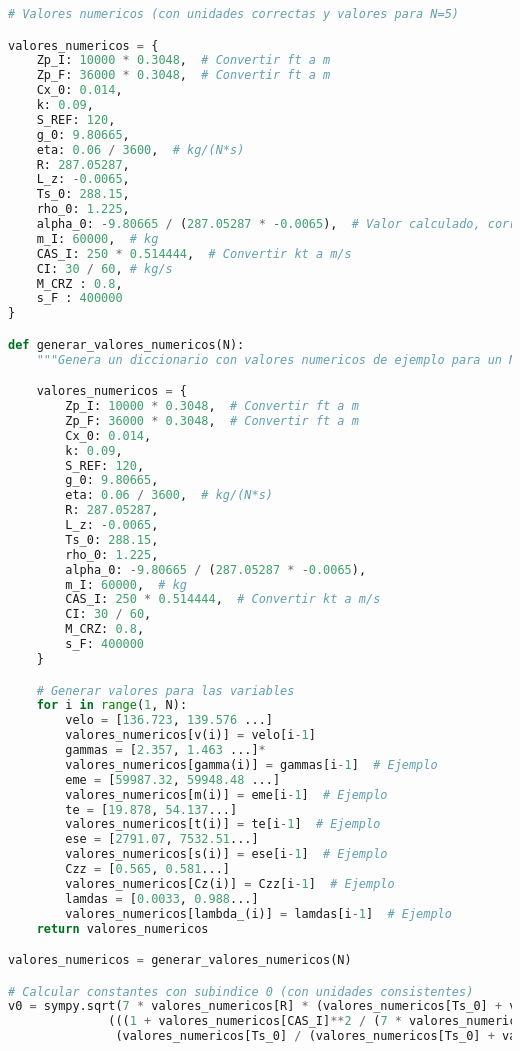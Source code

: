 \documentclass[fleqn]{article}
\begin{document}
\begin{lstlisting}[language=Python, firstnumber=last, style = mystyle]
# Valores numericos (con unidades correctas y valores para N=5)

valores_numericos = {
    Zp_I: 10000 * 0.3048,  # Convertir ft a m
    Zp_F: 36000 * 0.3048,  # Convertir ft a m
    Cx_0: 0.014,
    k: 0.09,
    S_REF: 120,
    g_0: 9.80665,
    eta: 0.06 / 3600,  # kg/(N*s)
    R: 287.05287,
    L_z: -0.0065,
    Ts_0: 288.15,
    rho_0: 1.225,
    alpha_0: -9.80665 / (287.05287 * -0.0065),  # Valor calculado, corregir signo
    m_I: 60000,  # kg
    CAS_I: 250 * 0.514444,  # Convertir kt a m/s
    CI: 30 / 60, # kg/s
    M_CRZ : 0.8,
    s_F : 400000
}

def generar_valores_numericos(N):
    """Genera un diccionario con valores numericos de ejemplo para un N dado."""

    valores_numericos = {
        Zp_I: 10000 * 0.3048,  # Convertir ft a m
        Zp_F: 36000 * 0.3048,  # Convertir ft a m
        Cx_0: 0.014,
        k: 0.09,
        S_REF: 120,
        g_0: 9.80665,
        eta: 0.06 / 3600,  # kg/(N*s)
        R: 287.05287,
        L_z: -0.0065,
        Ts_0: 288.15,
        rho_0: 1.225,
        alpha_0: -9.80665 / (287.05287 * -0.0065),
        m_I: 60000,  # kg
        CAS_I: 250 * 0.514444,  # Convertir kt a m/s
        CI: 30 / 60,
        M_CRZ: 0.8,
        s_F: 400000
    }

    # Generar valores para las variables
    for i in range(1, N):
        velo = [136.723, 139.576 ...]
        valores_numericos[v(i)] = velo[i-1]
        gammas = [2.357, 1.463 ...]*
        valores_numericos[gamma(i)] = gammas[i-1]  # Ejemplo
        eme = [59987.32, 59948.48 ...]
        valores_numericos[m(i)] = eme[i-1]  # Ejemplo
        te = [19.878, 54.137...]
        valores_numericos[t(i)] = te[i-1]  # Ejemplo
        ese = [2791.07, 7532.51...]
        valores_numericos[s(i)] = ese[i-1]  # Ejemplo
        Czz = [0.565, 0.581...]
        valores_numericos[Cz(i)] = Czz[i-1]  # Ejemplo
        lamdas = [0.0033, 0.988...]
        valores_numericos[lambda_(i)] = lamdas[i-1]  # Ejemplo
    return valores_numericos

valores_numericos = generar_valores_numericos(N)

# Calcular constantes con subindice 0 (con unidades consistentes)
v0 = sympy.sqrt(7 * valores_numericos[R] * (valores_numericos[Ts_0] + valores_numericos[L_z] * valores_numericos[Zp_I]) *
              (((1 + valores_numericos[CAS_I]**2 / (7 * valores_numericos[R] * valores_numericos[Ts_0]))**(3.5) - 1) *
               (valores_numericos[Ts_0] / (valores_numericos[Ts_0] + valores_numericos[L_z] * valores_numericos[Zp_I]))**(-valores_numericos[alpha_0]) + 1)**(1/3.5) - 1)



\end{lstlisting}
\end{document}
